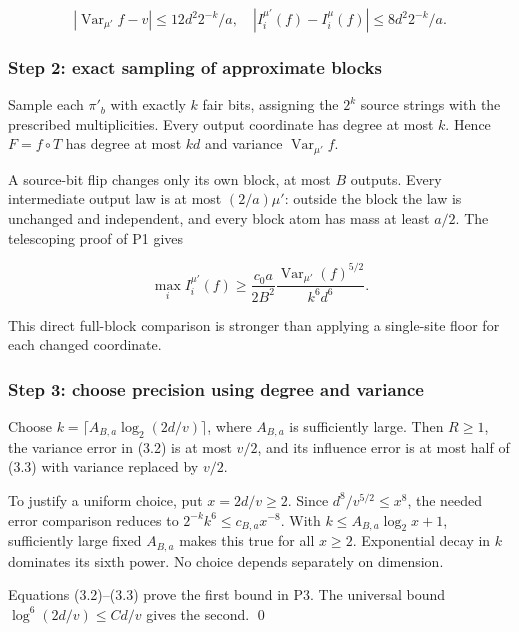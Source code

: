 \[
|\operatorname{Var}_{\mu'}f-v|\le12d^2 2^{-k}/a,
\quad |I_i^{\mu'}(f)-I_i^\mu(f)|\le8d^2 2^{-k}/a.
\tag{3.2}
\]

\subsubsection{Step 2: exact sampling of approximate
blocks}\label{proof:positive_structure:step-2-exact-sampling-of-approximate-blocks}

Sample each \(\pi'_b\) with exactly \(k\) fair bits, assigning the
\(2^k\) source strings with the prescribed multiplicities. Every output
coordinate has degree at most \(k\). Hence \(F=f\circ T\) has degree at
most \(kd\) and variance
\(\operatorname{\operatorname{Var}}_{\mu\prime} f\).

A source-bit flip changes only its own block, at most \(B\) outputs.
Every intermediate output law is at most \((2/a)\mu '\): outside the
block the law is unchanged and independent, and every block atom has
mass at least \(a/2\). The telescoping proof of P1 gives

\[
\max_i I_i^{\mu'}(f)
\ge\frac{c_0a}{2B^2}
\frac{\operatorname{Var}_{\mu'}(f)^{5/2}}{k^6d^6}.
\tag{3.3}
\]

This direct full-block comparison is stronger than applying a
single-site floor for each changed coordinate.

\subsubsection{Step 3: choose precision using degree and
variance}\label{proof:positive_structure:step-3-choose-precision-using-degree-and-variance}

Choose \(k=\lceil A_{B,a}\log_2(2d/v)\rceil\), where \(A_{B,a}\) is
sufficiently large. Then \(R\ge 1\), the variance error in (3.2) is at
most \(v/2\), and its influence error is at most half of (3.3) with
variance replaced by \(v/2\).

To justify a uniform choice, put \(x=2d/v\ge 2\). Since
\(d^8/v^{5/2}\le x^8\), the needed error comparison reduces to
\(2^{-k}k^6\le c_{B,a}x^{-8}\). With \(k\le A_{B,a}\log _2 x+1\),
sufficiently large fixed \(A_{B,a}\) makes this true for all \(x\ge 2\).
Exponential decay in \(k\) dominates its sixth power. No choice depends
separately on dimension.

Equations (3.2)--(3.3) prove the first bound in P3. The universal bound
\(\log ^6(2d/v)\le C d/v\) gives the second. \qed

